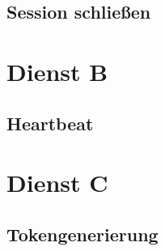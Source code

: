 \subsection*{Session schließen}
\label{subsec:Nachrichten:DienstA:CloseSession}





\section{Dienst B}
\label{subsec:Nachrichten:DienstB}

\subsection*{Heartbeat}
\label{subsec:Nachrichten:DienstB:HeartBeat}





\section{Dienst C}
\label{subsec:Nachrichten:DienstC}

\subsection*{Tokengenerierung}
\label{subsec:Nachrichten:DienstC:Tokengenerierung}



